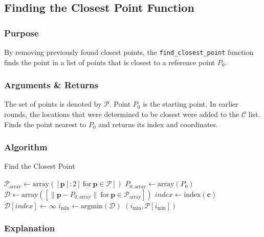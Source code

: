 \documentclass[12pt,a4paper]{report}
\begin{document}
\subsection{Finding the Closest Point Function}

\subsubsection{Purpose}
By removing previously found closest points, the \texttt{find\_closest\_point} function finds the point in a list of points that is closest to a reference point \( P_0 \).

\subsubsection{Arguments \& Returns}
The set of points is denoted by $\mathcal{P}$. Point $P_0$ is the starting point. In earlier rounds, the locations that were determined to be closest were added to the $\mathcal{C}$ list. Finds the point nearest to \( P_0 \) and returns its index and coordinates.

\subsubsection{Algorithm}

\begin{algorithm}
\caption{Find the Closest Point}
\begin{algorithmic}[1]
    \State $\mathcal{P}_{\text{array}} \gets \text{array}([\mathbf{p}[:2] \ \text{for} \ \mathbf{p} \in \mathcal{P}])$
    \State $P_{0,\text{array}} \gets \text{array}(P_0)$
    \State $\mathcal{D} \gets \text{array}([\|\mathbf{p} - P_{0,\text{array}}\| \ \text{for} \ \mathbf{p} \in \mathcal{P}_{\text{array}}])$
            \State $index \gets \text{index}(\mathbf{c})$
            \State $\mathcal{D}[index] \gets \infty$
        \EndIf
    \EndFor
    \State $i_{\text{min}} \gets \text{argmin}(\mathcal{D})$
    \State \Return $(i_{\text{min}}, \mathcal{P}[i_{\text{min}}])$
\EndFunction
\end{algorithmic}
\end{algorithm}

\subsubsection{Explanation}
\end{document}

